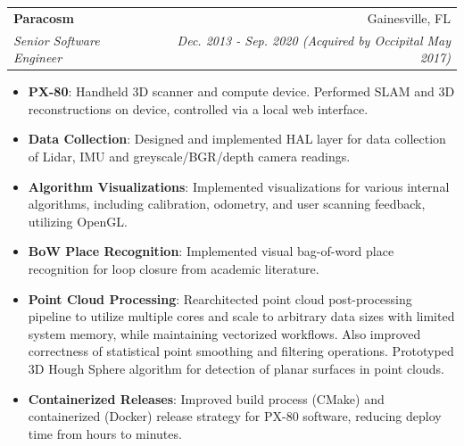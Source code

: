 \documentclass[letterpaper,11pt]{article}
\makeatletter
\newcommand{\resumeItem}[2]{
  \item\small{
    \textbf{#1}{: #2 \vspace{-2pt}}
  }
}
\newcommand{\resumeSubheading}[4]{
  \vspace{-1pt}\item
    \begin{tabular*}{0.97\textwidth}[t]{l@{\extracolsep{\fill}}r}
      \textbf{#1} & #2 \\
      \textit{\small#3} & \textit{\small #4} \\
    \end{tabular*}\vspace{-5pt}
}
\newcommand{\resumeItemListStart}{\begin{itemize}}
\newcommand{\resumeItemListEnd}{\end{itemize}\vspace{-5pt}}
\makeatother
\begin{document}
   \resumeSubheading
      {Paracosm}{Gainesville, FL}
      {Senior Software Engineer}{Dec. 2013 - Sep. 2020 (Acquired by Occipital May 2017)}
      \resumeItemListStart
        \resumeItem{PX-80}
          {Handheld 3D scanner and compute device. Performed SLAM and 3D
          reconstructions on device, controlled via a local web interface.}
        \resumeItem{Data Collection}
          {Designed and implemented HAL layer for data collection of Lidar, IMU
          and greyscale/BGR/depth camera readings.}
        \resumeItem{Algorithm Visualizations}
          {Implemented visualizations for various internal algorithms,
          including calibration, odometry, and user scanning feedback,
          utilizing OpenGL.}
        \resumeItem{BoW Place Recognition}
          {Implemented visual bag-of-word place recognition for loop closure
          from academic literature.}
        \resumeItem{Point Cloud Processing}
          {Rearchitected point cloud post-processing pipeline to utilize
          multiple cores and scale to arbitrary data sizes with limited system
          memory, while maintaining vectorized workflows. Also improved
          correctness of statistical point smoothing and filtering operations.
          Prototyped 3D Hough Sphere algorithm for detection of planar surfaces
          in point clouds.}
        \resumeItem{Containerized Releases}
          {Improved build process (CMake) and containerized (Docker) release
          strategy for PX-80 software, reducing deploy time from hours to
          minutes.}

      \resumeItemListEnd
\end{document}
